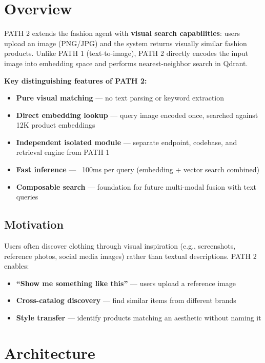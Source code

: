 \section{Overview}

PATH 2 extends the fashion agent with \textbf{visual search capabilities}: users upload an image (PNG/JPG) and the system returns visually similar fashion products. Unlike PATH 1 (text-to-image), PATH 2 directly encodes the input image into embedding space and performs nearest-neighbor search in Qdrant.

\textbf{Key distinguishing features of PATH 2:}
\begin{itemize}
    \item \textbf{Pure visual matching} --- no text parsing or keyword extraction
    \item \textbf{Direct embedding lookup} --- query image encoded once, searched against 12K product embeddings
    \item \textbf{Independent isolated module} --- separate endpoint, codebase, and retrieval engine from PATH 1
    \item \textbf{Fast inference} --- ~100ms per query (embedding + vector search combined)
    \item \textbf{Composable search} --- foundation for future multi-modal fusion with text queries
\end{itemize}

\subsection{Motivation}

Users often discover clothing through visual inspiration (e.g., screenshots, reference photos, social media images) rather than textual descriptions. PATH 2 enables:
\begin{itemize}
    \item \textbf{``Show me something like this''} --- users upload a reference image
    \item \textbf{Cross-catalog discovery} --- find similar items from different brands
    \item \textbf{Style transfer} --- identify products matching an aesthetic without naming it
\end{itemize}

\section{Architecture}

